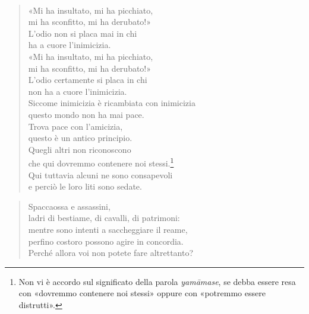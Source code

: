 \\

\begin{quote}
«Mi ha insultato, mi ha picchiato, \\
mi ha sconfitto, mi ha derubato!» \\
L’odio non si placa mai in chi \\
ha a cuore l’inimicizia. \\
«Mi ha insultato, mi ha picchiato, \\
mi ha sconfitto, mi ha derubato!» \\
L’odio certamente si placa in chi \\
non ha a cuore l’inimicizia. \\
Siccome inimicizia è ricambiata con inimicizia \\
questo mondo non ha mai pace. \\
Trova pace con l’amicizia, \\
questo è un antico principio. \\
Quegli altri non riconoscono \\
che qui dovremmo contenere noi stessi.\footnote{Non vi è accordo sul significato della parola \emph{yamāmase}, se debba essere resa con «dovremmo contenere noi stessi» oppure con «potremmo essere distrutti».} \\
Qui tuttavia alcuni ne sono consapevoli \\
e perciò le loro liti sono sedate.
\end{quote}


\begin{quote}
Spaccaossa e assassini, \\
ladri di bestiame, di cavalli, di patrimoni: \\
mentre sono intenti a saccheggiare il reame, \\
perfino costoro possono agire in concordia. \\
Perché allora voi non potete fare altrettanto?
\end{quote}


